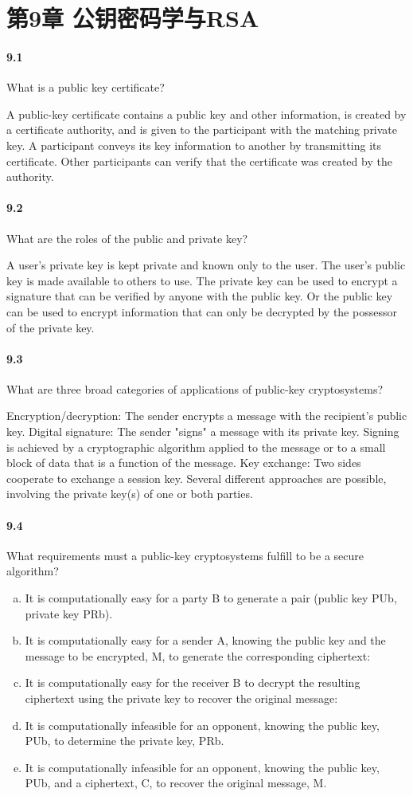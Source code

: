 \documentclass[UTF8]{article}
\begin{document}
\section{第9章 公钥密码学与RSA}
\paragraph{9.1}
What is a public key certificate?

A public-key certificate contains a public key and other information, is created by a certificate authority, and is given to the participant with the matching private key. A participant conveys its key information to another by transmitting its certificate. Other participants can verify that the certificate was created by the authority.
\paragraph{9.2}
What are the roles of the public and private key?

A user's private key is kept private and known only to the user. The user's public key is made available to others to use. The private key can be used to encrypt a signature that can be verified by anyone with the public key. Or the public key can be used to encrypt information that can only be decrypted by the possessor of the private key.
\paragraph{9.3}
What are three broad categories of applications of public-key cryptosystems?

Encryption/decryption: The sender encrypts a message with the recipient's public key. Digital signature: The sender "signs" a message with its private key. Signing is achieved by a cryptographic algorithm applied to the message or to a small block of data that is a function of the message. Key exchange: Two sides cooperate to exchange a session key. Several different approaches are possible, involving the private key(s) of one or both parties.
\paragraph{9.4}
What requirements must a public-key cryptosystems fulfill to be a secure algorithm?
\begin{enumerate}[(a)]
    \item It is computationally easy for a party B to generate a pair (public key PUb, private key PRb).
    \item It is computationally easy for a sender A, knowing the public key and the message to be encrypted, M, to generate the corresponding ciphertext:
    \item It is computationally easy for the receiver B to decrypt the resulting ciphertext using the private key to recover the original message:
    \item It is computationally infeasible for an opponent, knowing the public key, PUb, to determine the private key, PRb.
    \item It is computationally infeasible for an opponent, knowing the public key, PUb, and a ciphertext, C, to recover the original message, M.
\end{enumerate}
\end{document}
